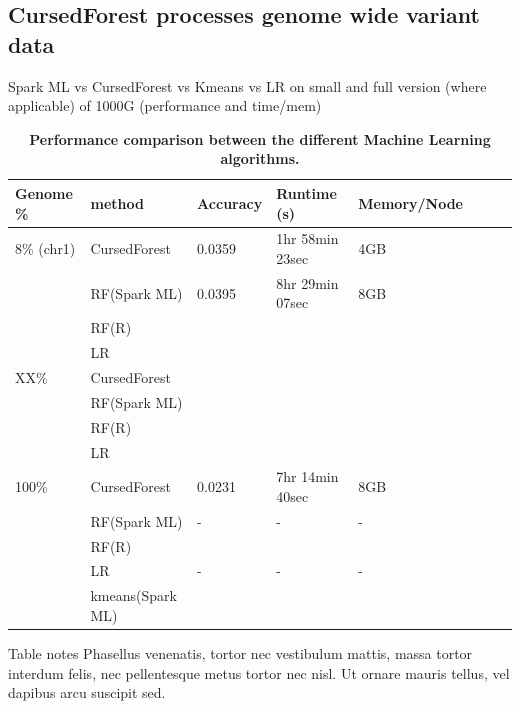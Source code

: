 \documentclass[10pt,letterpaper]{article}
\begin{document}
\subsection*{CursedForest processes genome wide variant data}
\label{comp}
Spark ML vs CursedForest vs Kmeans vs LR on small and full version (where applicable) of 1000G (performance and
time/mem)


\begin{table}[!ht]
\caption{
{\bf Performance comparison between the different Machine Learning algorithms.}}
\begin{tabular}{|l|l|l|l|l|l|l|l|}
\hline
\bf{Genome \%}  & \bf{method} & \bf{Accuracy} & \bf{Runtime (s)} & \bf{Memory/Node} \\
\hline
8\% (chr1) & CursedForest & 0.0359 & 1hr 58min 23sec & 4GB \\ \hline
          & RF(Spark ML) & 0.0395 & 8hr 29min 07sec & 8GB \\ \hline
          &  RF(R) & &  &\\ \hline
          &  LR & &  &\\ \hline
XX\% & CursedForest & &  &\\ \hline
          & RF(Spark ML) & &  &\\ \hline
          &  RF(R) & &  &\\ \hline
          &  LR & &  &\\ \hline

100\% & CursedForest & 0.0231 & 7hr 14min 40sec & 8GB \\ \hline
          & RF(Spark ML) & - & - & - \\ \hline
          &  RF(R) & &  &\\ \hline
          &  LR & - & - & - \\ \hline
          & kmeans(Spark ML) & & & \\ \hline
\end{tabular}
\begin{flushleft} 
  Table notes Phasellus venenatis, tortor nec vestibulum mattis, massa tortor interdum felis, nec pellentesque metus
  tortor nec nisl. Ut ornare mauris tellus, vel dapibus arcu suscipit sed.
\end{flushleft}
\label{table1}
\end{table}
\end{document}
